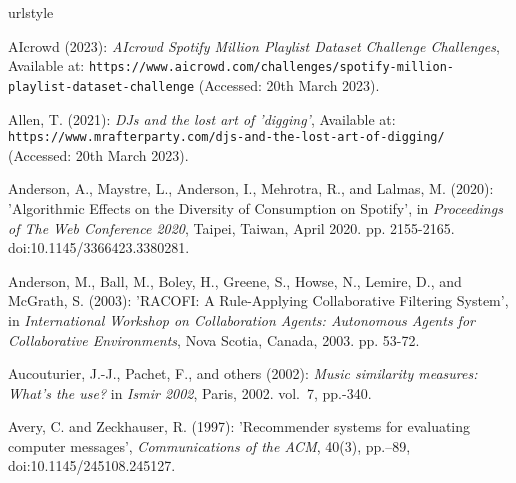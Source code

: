 \documentclass[11pt,titlepage,oneside]{book}
\begin{document}
\begin{thebibliography}{97}
	\newcommand{\enquote}[1]{\textit{#1}}
	\newcommand{\quote}[1]{'#1'}
	\providecommand{\natexlab}[1]{#1}
	\providecommand{\url}[1]{\texttt{#1}}
	\providecommand{\urlprefix}{Available at: }
	\expandafter\ifx\csname urlstyle\endcsname\relax
	\providecommand{\doi}[1]{doi:\discretionary{}{}{}#1}\else
	\providecommand{\doi}{doi:\discretionary{}{}{}\begingroup
		\urlstyle{rm}\Url}\fi
	
	AIcrowd (2023): \enquote{{AIcrowd} {\textbar} {Spotify} {Million} {Playlist}
		{Dataset} {Challenge} {\textbar} {Challenges}},
	\urlprefix\url{https://www.aicrowd.com/challenges/spotify-million-playlist-dataset-challenge} (Accessed: 20th March 2023).
	
	Allen, T. (2021): \enquote{{DJs} and the lost art of 'digging'},
	\urlprefix\url{https://www.mrafterparty.com/djs-and-the-lost-art-of-digging/} (Accessed: 20th March 2023).
	
	Anderson, A., Maystre, L., Anderson, I., Mehrotra, R., and Lalmas, M. (2020):
	'Algorithmic {Effects} on the {Diversity} of {Consumption} on
		{Spotify}', in \textit{Proceedings of {The} {Web} {Conference} 2020}, Taipei,
	Taiwan, April 2020. pp. 2155-2165. \doi{10.1145/3366423.3380281}.
	
	Anderson, M., Ball, M., Boley, H., Greene, S., Howse, N., Lemire, D., and
	McGrath, S. (2003): '{RACOFI}: {A} {Rule}-{Applying} {Collaborative}
		{Filtering} {System}', in \textit{International Workshop on Collaboration Agents: Autonomous Agents for Collaborative Environments}, Nova Scotia, Canada, 2003. pp. 53-72.
	
	Aucouturier, J.-J., Pachet, F., and {others} (2002): \enquote{Music similarity
		measures: {What}'s the use?} in \textit{Ismir 2002}, Paris, 2002. vol.~7, pp.-340.
	
	Avery, C. and Zeckhauser, R. (1997): 'Recommender systems for
		evaluating computer messages', \textit{Communications of the ACM}, 40(3),
	pp.--89, \doi{10.1145/245108.245127}.
	

\end{thebibliography}
\end{document}
